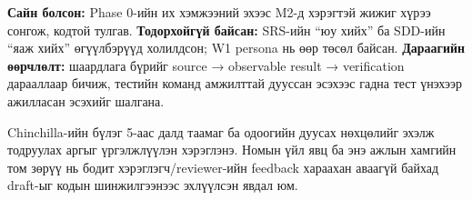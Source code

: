 \textbf{Сайн болсон:} Phase 0-ийн их хэмжээний эхээс M2-д хэрэгтэй жижиг
хүрээ сонгож, кодтой тулгав. \textbf{Тодорхойгүй байсан:} SRS-ийн ``юу
хийх'' ба SDD-ийн ``яаж хийх'' өгүүлбэрүүд холилдсон; W1 persona нь өөр
төсөл байсан. \textbf{Дараагийн өөрчлөлт:} шаардлага бүрийг source →
observable result → verification дарааллаар бичиж, тестийн команд
амжилттай дууссан эсэхээс гадна тест үнэхээр ажилласан эсэхийг шалгана.

Chinchilla-ийн бүлэг 5-аас далд таамаг ба одоогийн дуусах нөхцөлийг
эхэлж тодруулах аргыг үргэлжлүүлэн хэрэглэнэ. Номын үйл явц ба энэ ажлын
хамгийн том зөрүү нь бодит хэрэглэгч/reviewer-ийн feedback хараахан
аваагүй байхад draft-ыг кодын шинжилгээнээс эхлүүлсэн явдал юм.
